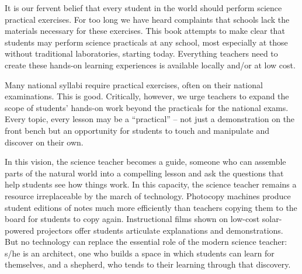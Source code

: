 It is our fervent belief that every student in the world should perform science practical exercises. For too long we have heard complaints that schools lack the materials necessary for these exercises. This book attempts to make clear that students may perform science practicals at any school, most especially at those without traditional laboratories, starting today. Everything teachers need to create these hands-on learning experiences is available locally and/or at low cost.

Many national syllabi require practical exercises, often on their national examinations. This is good. Critically, however, we urge teachers to expand the scope of students' hands-on work beyond the practicals for the national exams. Every topic, every lesson may be a ``practical'' -- not just a demonstration on the front bench but an opportunity for students to touch and manipulate and discover on their own.

In this vision, the science teacher becomes a guide, someone who can assemble parts of the natural world into a compelling lesson and ask the questions that help students see how things work. In this capacity, the science teacher remains a resource irreplaceable by the march of technology. Photocopy machines produce student editions of notes much more efficiently than teachers copying them to the board for students to copy again. Instructional films shown on low-cost solar-powered projectors offer students articulate explanations and demonstrations. But no technology can replace the essential role of the modern science teacher: s/he is an architect, one who builds a space in which students can learn for themselves, and a shepherd, who tends to their learning through that discovery.

